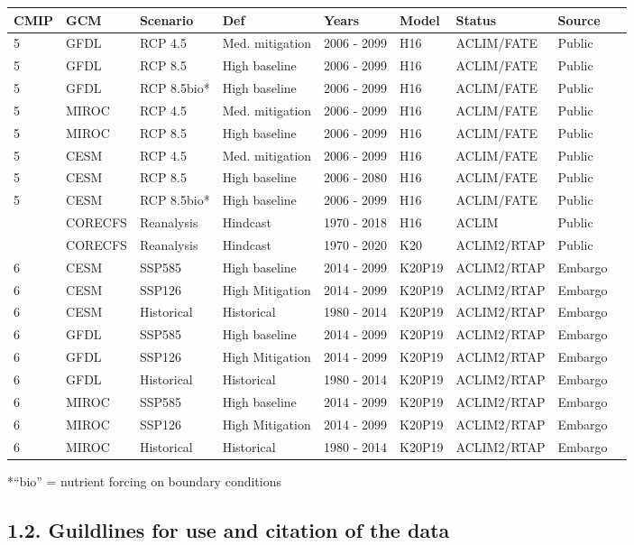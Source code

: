 \documentclass[
]{article}
\begin{document}
\begin{longtable}[]{@{}lllllllll@{}}
\toprule
CMIP & GCM & Scenario & Def & Years & Model & Status & Source
&\tabularnewline
\midrule
\endhead
5 & GFDL & RCP 4.5 & Med. mitigation & 2006 - 2099 & H16 & ACLIM/FATE &
Public &\tabularnewline
5 & GFDL & RCP 8.5 & High baseline & 2006 - 2099 & H16 & ACLIM/FATE &
Public &\tabularnewline
5 & GFDL & RCP 8.5bio* & High baseline & 2006 - 2099 & H16 & ACLIM/FATE
& Public &\tabularnewline
5 & MIROC & RCP 4.5 & Med. mitigation & 2006 - 2099 & H16 & ACLIM/FATE &
Public &\tabularnewline
5 & MIROC & RCP 8.5 & High baseline & 2006 - 2099 & H16 & ACLIM/FATE &
Public &\tabularnewline
5 & CESM & RCP 4.5 & Med. mitigation & 2006 - 2099 & H16 & ACLIM/FATE &
Public &\tabularnewline
5 & CESM & RCP 8.5 & High baseline & 2006 - 2080 & H16 & ACLIM/FATE &
Public &\tabularnewline
5 & CESM & RCP 8.5bio* & High baseline & 2006 - 2099 & H16 & ACLIM/FATE
& Public &\tabularnewline
& CORECFS & Reanalysis & Hindcast & 1970 - 2018 & H16 & ACLIM & Public
&\tabularnewline
& CORECFS & Reanalysis & Hindcast & 1970 - 2020 & K20 & ACLIM2/RTAP &
Public &\tabularnewline
6 & CESM & SSP585 & High baseline & 2014 - 2099 & K20P19 & ACLIM2/RTAP &
Embargo &\tabularnewline
6 & CESM & SSP126 & High Mitigation & 2014 - 2099 & K20P19 & ACLIM2/RTAP
& Embargo &\tabularnewline
6 & CESM & Historical & Historical & 1980 - 2014 & K20P19 & ACLIM2/RTAP
& Embargo &\tabularnewline
6 & GFDL & SSP585 & High baseline & 2014 - 2099 & K20P19 & ACLIM2/RTAP &
Embargo &\tabularnewline
6 & GFDL & SSP126 & High Mitigation & 2014 - 2099 & K20P19 & ACLIM2/RTAP
& Embargo &\tabularnewline
6 & GFDL & Historical & Historical & 1980 - 2014 & K20P19 & ACLIM2/RTAP
& Embargo &\tabularnewline
6 & MIROC & SSP585 & High baseline & 2014 - 2099 & K20P19 & ACLIM2/RTAP
& Embargo &\tabularnewline
6 & MIROC & SSP126 & High Mitigation & 2014 - 2099 & K20P19 &
ACLIM2/RTAP & Embargo &\tabularnewline
6 & MIROC & Historical & Historical & 1980 - 2014 & K20P19 & ACLIM2/RTAP
& Embargo &\tabularnewline
\bottomrule
\end{longtable}

*``bio'' = nutrient forcing on boundary conditions

\hypertarget{guildlines-for-use-and-citation-of-the-data}{%
\subsection{1.2. Guildlines for use and citation of the
data}\label{guildlines-for-use-and-citation-of-the-data}}
\end{document}
